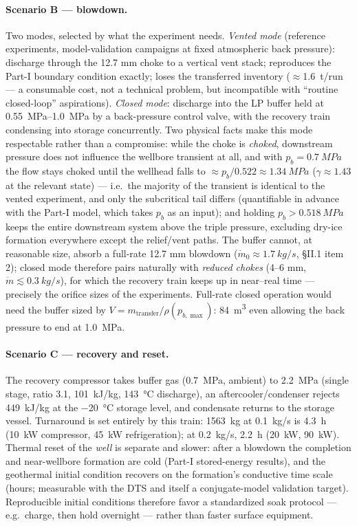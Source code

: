 \paragraph{Scenario B --- blowdown.} Two modes, selected by what the
experiment needs. \emph{Vented mode} (reference experiments,
model-validation campaigns at fixed atmospheric back pressure):
discharge through the 12.7 mm choke to a vertical vent stack;
reproduces the Part-I boundary condition exactly; loses the
transferred inventory ($\approx$\SI{1.6}{t}/run --- a consumable
cost, not a technical problem, but incompatible with
``routine closed-loop'' aspirations). \emph{Closed mode}: discharge
into the LP buffer held at \SIrange{0.55}{1.0}{MPa} by a
back-pressure control valve, with the recovery train condensing into
storage concurrently. Two physical facts make this mode respectable
rather than a compromise: while the choke is \emph{choked},
downstream pressure does not influence the wellbore transient at all,
and with $p_b = \SI{0.7}{MPa}$ the flow stays choked until the
wellhead falls to $\approx p_b/0.522 \approx \SI{1.34}{MPa}$
($\gamma \approx 1.43$ at the relevant state) --- i.e.\ the majority
of the transient is identical to the vented experiment, and only the
subcritical tail differs (quantifiable in advance with the Part-I
model, which takes $p_b$ as an input); and holding
$p_b > \SI{0.518}{MPa}$ keeps the entire downstream system above the
triple pressure, excluding dry-ice formation everywhere except the
relief/vent paths. The buffer cannot, at reasonable size, absorb a
full-rate 12.7 mm blowdown ($\dot m_0 \approx \SI{1.7}{kg/s}$,
\S II.1 item 2); closed mode therefore pairs naturally with
\emph{reduced chokes} (4--6 mm, $\dot m \lesssim \SI{0.3}{kg/s}$),
for which the recovery train keeps up in near--real time ---
precisely the orifice sizes of the \citet{hammer2022} experiments.
Full-rate closed operation would need the buffer sized by
$V = m_{\mathrm{transfer}}/\rho(p_{b,\max})$: \SI{84}{m^3} even
allowing the back pressure to end at \SI{1.0}{MPa}.

\paragraph{Scenario C --- recovery and reset.} The recovery
compressor takes buffer gas (\SI{0.7}{MPa}, ambient) to
\SI{2.2}{MPa} (single stage, ratio 3.1, \SI{101}{kJ/kg},
\SI{143}{\celsius} discharge), an aftercooler/condenser rejects
\SI{449}{kJ/kg} at the \SI{-20}{\celsius} storage level, and
condensate returns to the storage vessel. Turnaround is set entirely
by this train: \SI{1563}{kg} at \SI{0.1}{kg/s} is \SI{4.3}{h}
(\SI{10}{kW} compressor, \SI{45}{kW} refrigeration); at
\SI{0.2}{kg/s}, \SI{2.2}{h} (\SI{20}{kW}, \SI{90}{kW}). Thermal reset
of the \emph{well} is separate and slower: after a blowdown the
completion and near-wellbore formation are cold (Part-I stored-energy
results), and the geothermal initial condition recovers on the
formation's conductive time scale (hours; measurable with the DTS and
itself a conjugate-model validation target). Reproducible initial
conditions therefore favor a standardized soak protocol ---
e.g.\ charge, then hold overnight --- rather than faster surface
equipment.

